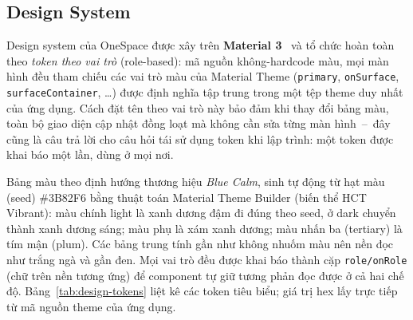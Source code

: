 \subsection{Design System}
\label{sec:design-system}

\newcommand{\sw}[2]{\colorbox[HTML]{#1}{\textcolor[HTML]{#2}{\rule{0pt}{0.35cm}\hspace{0.7cm}}}}

Design system của OneSpace được xây trên \textbf{Material 3}~\cite{material3} và tổ chức hoàn toàn theo \textit{token theo vai trò} (role-based): mã nguồn không-hardcode màu, mọi màn hình đều tham chiếu các vai trò màu của Material Theme (\texttt{primary}, \texttt{onSurface}, \texttt{surfaceContainer}, \ldots) được định nghĩa tập trung trong một tệp theme duy nhất của ứng dụng. Cách đặt tên theo vai trò này bảo đảm khi thay đổi bảng màu, toàn bộ giao diện cập nhật đồng loạt mà không cần sửa từng màn hình~--~đây cũng là câu trả lời cho câu hỏi tái sử dụng token khi lập trình: một token được khai báo một lần, dùng ở mọi nơi.

Bảng màu theo định hướng thương hiệu \textit{Blue Calm}, sinh tự động từ hạt màu (seed) \#3B82F6 bằng thuật toán Material Theme Builder (biến thể HCT Vibrant): màu chính light là xanh dương đậm đi đúng theo seed, ở dark chuyển thành xanh dương sáng; màu phụ là xám xanh dương; màu nhấn ba (tertiary) là tím mận (plum). Các bảng trung tính gần như không nhuốm màu nên nền đọc như trắng ngà và gần đen. Mọi vai trò đều được khai báo thành cặp \texttt{role/onRole} (chữ trên nền tương ứng) để component tự giữ tương phản đọc được ở cả hai chế độ. Bảng~\ref{tab:design-tokens} liệt kê các token tiêu biểu; giá trị hex lấy trực tiếp từ mã nguồn theme của ứng dụng.

